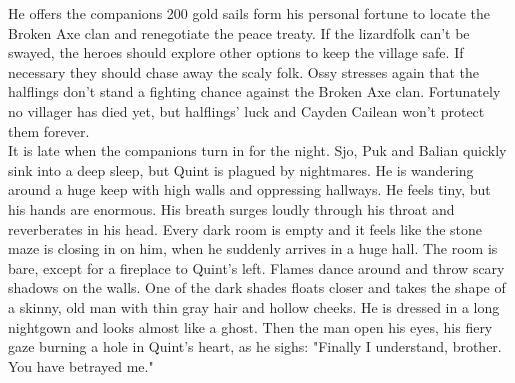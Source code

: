 He offers the companions 200 gold sails form his personal fortune to locate the Broken Axe clan and renegotiate the peace treaty. If the lizardfolk can't be swayed, the heroes should explore other options to keep the village safe. If necessary they should chase away the scaly folk. Ossy stresses again that the halflings don't stand a fighting chance against the Broken Axe clan. Fortunately no villager has died yet, but halflings' luck and Cayden Cailean won't protect them forever.\\

It is late when the companions turn in for the night. Sjo, Puk and Balian quickly sink into a deep sleep, but Quint is plagued by nightmares. He is wandering around a huge keep with high walls and oppressing hallways. He feels tiny, but his hands are enormous. His breath surges loudly through his throat and reverberates in his head. Every dark room is empty and it feels like the stone maze is closing in on him, when he suddenly arrives in a huge hall. The room is bare, except for a fireplace to Quint's left. Flames dance around and throw scary shadows on the walls. One of the dark shades floats closer and takes the shape of a skinny, old man with thin gray hair and hollow cheeks. He is dressed in a long nightgown and looks almost like a ghost. Then the man open his eyes, his fiery gaze burning a hole in Quint's heart, as he sighs: "Finally I understand, brother. You have betrayed me."\\

